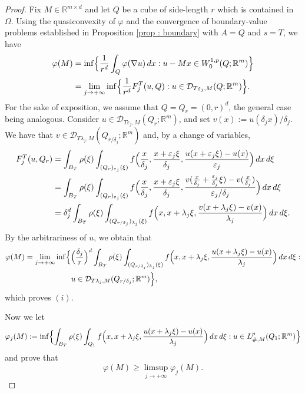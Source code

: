 \documentclass[10pt,a4paper]{amsart}
\newcommand{\R}{\mathbb{R}}
\newcommand{\dej}{\delta_j}
\newcommand{\ej}{\varepsilon_j}
\newcommand{\f}{\varphi}
\begin{document}
\begin{proof}
Fix $M\in \R^{m\times d}$ and let $Q$ be a cube of side-length $r$ which is contained in $\Omega$. Using the quasiconvexity of $\f$ and the convergence of boundary-value problems established in Proposition \ref{prop : boundary} with $A=Q$ and $s=T$, we have
    \begin{align*}
      \f(M) & = \inf \Bigl\{ \frac{1}{r^d}\int_{Q} \f(\nabla u) \, dx: u-Mx\in W^{1,p}_0(Q; \R^m) \Bigr\} \\ 
      & = \lim_{j\to+\infty} \inf\Bigl\{ \frac{1}{r^d}F^T_j(u, Q) : u\in \mathcal{D}_{T\ej,M}(Q; \R^m) \Bigr\}.
    \end{align*}
For the sake of exposition, we assume that $Q=Q_r=(0,r)^d$, the general case being analogous. Consider $u\in \mathcal{D}_{T\ej,M}(Q_r;\R^m)$, and set $v(x):=u(\dej x)/\dej$. We have that $v\in \mathcal{D}_{T\lambda_j,M}(Q_{r/\dej}; \R^m)$ and, by a change of variables, 
\begin{align*}
    F_j^T(u, Q_r) & = \int_{B_T} \rho(\xi)\int_{(Q_r)_{\ej}(\xi)} f\Bigl(\frac{x}{\dej},\frac{x+\ej\xi}{\dej},\frac{u(x+\ej\xi)-u(x)}{\ej}\Bigr)\, dx\,d\xi \\
    & = \int_{B_T} \rho(\xi)\int_{(Q_r)_{\ej}(\xi)} f\Bigl(\frac{x}{\dej},\frac{x+\ej\xi}{\dej},\frac{v(\tfrac{x}{\dej}+\tfrac{\ej}{\dej}\xi)-v(\tfrac{x}{\dej})}{\ej/\dej}\Bigr)\, dx\,d\xi \\
    & = \dej^d\int_{B_T} \rho(\xi)\int_{(Q_{r/\dej})_{\lambda_j}(\xi)} f\Bigl(x, x+\lambda_j\xi, \frac{v(x+\lambda_j\xi)-v(x)}{\lambda_j}\Bigr)\, dx\,d\xi.
\end{align*}
By the arbitrariness of $u$, we obtain that 
\begin{align*}
    \f(M) & = \lim_{j\to+\infty} \inf\Bigl\{ \Bigl(\frac{\dej}{r}\Bigr)^d\int_{B_T} \rho(\xi)\int_{(Q_{r/\dej})_{\lambda_j}(\xi)} f\Bigl(x, x+\lambda_j\xi, \frac{u(x+\lambda_j\xi)-u(x)}{\lambda_j}\Bigr)\, dx\,d\xi : \\
    & \qquad \qquad \qquad u\in \mathcal{D}_{T\lambda_j,M}(Q_{r/\dej}; \R^m) \Bigr\},
\end{align*}
which proves $(i)$.

\smallskip

Now we let
\begin{equation*}
    \f_j(M):=\inf\Bigl\{ \int_{B_T} \rho(\xi)\int_{Q_1} f\Bigl(x,x+\lambda_j\xi,\frac{u(x+\lambda_j\xi)-u(x)}{\lambda_j}\Bigr)\, dx\,d\xi : u\in L^p_{\#,M}(Q_1; \R^m) \Bigr\}
\end{equation*}
and prove that
\begin{equation}\label{cell lemma}
    \f(M)\geq \limsup_{j\to+\infty} \f_j(M).
\end{equation}


\end{proof}
\end{document}
